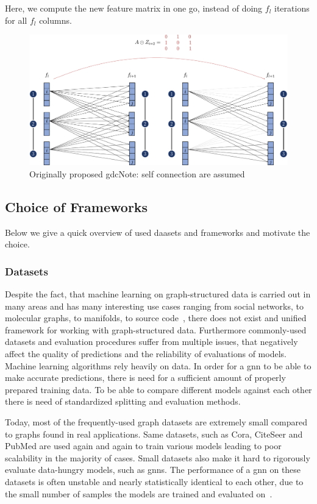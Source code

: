 Here, we compute the new feature matrix in one go, instead of doing $f_{l}$ iterations for all $f_{l}$ columns.
\begin{figure}[ht]
    \centering
    \includegraphics[width= 0.90\linewidth]{gfx/implementation/GDC-eq5.pdf}
    \caption{Originally proposed \ac{gdc}Note: self connection are assumed}\label{fig:implementaion:GDC-eq5}
\end{figure}

\subsection{Choice of Frameworks}
\label{sec:implement:setup:choice}
Below we give a quick overview of used daasets and frameworks and motivate the choice.


\subsubsection{Datasets}
\label{sec:implement:setup:choice:data}
Despite the fact, that machine learning on graph-structured data is carried out in many areas and has many interesting use cases ranging from social networks, to molecular graphs, to manifolds, to source code~\cite{Hu2020},
there does not exist and unified framework for working with graph-structured data. Furthermore commonly-used datasets and evaluation procedures suffer from multiple issues, that negatively affect the quality of predictions and the reliability of evaluations of models.
Machine learning algorithms rely heavily on data. In order for a \ac{gnn} to be able to make accurate predictions, there is need for a sufficient amount of properly prepared training data. To be able to compare different models against each other there is need of standardized splitting and evaluation methods.

Today, most of the frequently-used
graph datasets are extremely small compared to graphs found in
real applications. Same datasets, such as Cora, CiteSeer and PubMed are used again and again to train various models leading to poor scalability in the majority of cases. Small datasets also make it hard to rigorously evaluate data-hungry models, such as \acfp{gnn}. The performance of a \ac{gnn} on these datasets is often unstable and nearly statistically identical to each other, due to the small number of samples the models are trained and evaluated on~\cite{Kipf2017,Xu2019, Hu2020}.

